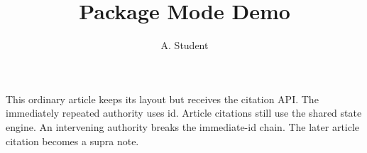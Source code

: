 \documentclass{article}
\title{Package Mode Demo}
\author{A. Student}
\begin{document}
\maketitle

This ordinary article keeps its layout but receives the citation API.
The immediately repeated authority uses id.
Article citations still use the shared state engine.
An intervening authority breaks the immediate-id chain.
The later article citation becomes a supra note.

\printbibliography
\end{document}
